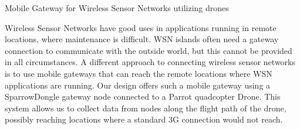 Mobile Gateway for Wireless Sensor Networks utilizing drones

Wireless Sensor Networks have good uses in applications running in remote locations, where maintenance is difficult. WSN islands often need a gateway connection to communicate with the outside world, but this cannot be provided in all circumstances.  A different approach to connecting wireless sensor networks is to use mobile gateways that can reach the remote locations where WSN applications are running. Our design offers such a  mobile gateway using a SparrowDongle gateway node connected to a Parrot quadcopter Drone. This system allows us to collect data from nodes along the flight path of the drone, possibly reaching locations where a standard 3G connection would not reach.
